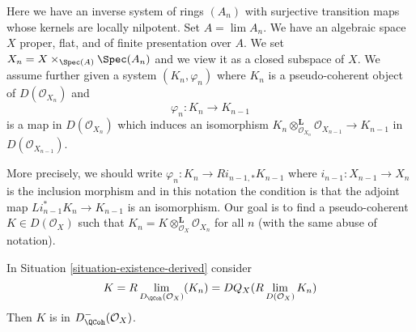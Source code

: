 \begin{situation}
\label{situation-existence-derived}
Here we have an inverse system of rings $(A_n)$ with surjective transition
maps whose kernels are locally nilpotent. Set $A = \lim A_n$. We have an
algebraic space $X$ proper, flat, and of finite presentation over $A$.
We set $X_n = X \times_{\Spec(A)} \Spec(A_n)$ and we
view it as a closed subspace of $X$. We assume further given a system
$(K_n, \varphi_n)$ where $K_n$ is a pseudo-coherent object of
$D(\mathcal{O}_{X_n})$ and
$$
\varphi_n : K_n \longrightarrow K_{n - 1}
$$
is a map in $D(\mathcal{O}_{X_n})$ which induces an isomorphism
$K_n \otimes_{\mathcal{O}_{X_n}}^\mathbf{L} \mathcal{O}_{X_{n - 1}}
\to K_{n - 1}$ in $D(\mathcal{O}_{X_{n - 1}})$.
\end{situation}

\noindent
More precisely, we should write
$\varphi_n : K_n \to Ri_{n - 1, *}K_{n - 1}$
where $i_{n - 1} : X_{n - 1} \to X_n$ is the inclusion morphism
and in this notation the condition is that the adjoint
map $Li_{n - 1}^*K_n \to K_{n - 1}$ is an isomorphism.
Our goal is to find a pseudo-coherent $K \in D(\mathcal{O}_X)$
such that $K_n = K \otimes_{\mathcal{O}_X}^\mathbf{L} \mathcal{O}_{X_n}$
for all $n$ (with the same abuse of notation).

\begin{lemma}
\label{lemma-compute-what-it-should-be-derived}
In Situation \ref{situation-existence-derived} consider
$$
K = R\lim_{D_\QCoh(\mathcal{O}_X)}(K_n) =
DQ_X(R\lim_{D(\mathcal{O}_X)} K_n)
$$
Then $K$ is in $D^-_{\QCoh}(\mathcal{O}_X)$.
\end{lemma}


